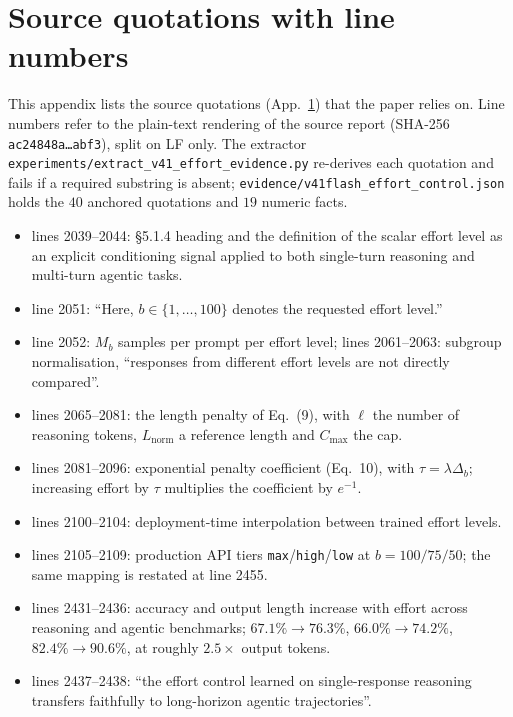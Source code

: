 \documentclass[10pt]{article} %
\newcommand{\eff}{b}
\begin{document}
\appendix

\section{Source quotations with line numbers}
\label{app:quotes}

This appendix lists the source quotations (App.~\ref{app:quotes}) that the paper relies on. Line numbers refer to the plain-text rendering of the source report
(SHA-256 \texttt{ac24848a\ldots abf3}), split on LF only. The extractor
\texttt{experiments/extract\_v41\_effort\_evidence.py} re-derives each quotation
and fails if a required substring is absent;
\texttt{evidence/v41flash\_effort\_control.json} holds the $40$ anchored
quotations and $19$ numeric facts.

\begin{itemize}
\item lines 2039--2044: \S5.1.4 heading and the definition of the scalar effort
  level as an explicit conditioning signal applied to both single-turn reasoning
  and multi-turn agentic tasks.
\item line 2051: ``Here, $\eff \in \{1, \ldots, 100\}$ denotes the requested
  effort level.''
\item line 2052: $M_b$ samples per prompt per effort level; lines 2061--2063:
  subgroup normalisation, ``responses from different effort levels are not
  directly compared''.
\item lines 2065--2081: the length penalty of Eq.~(9), with $\ell$ the number of
  reasoning tokens, $L_{\mathrm{norm}}$ a reference length and $C_{\max}$ the cap.
\item lines 2081--2096: exponential penalty coefficient (Eq.~10), with
  $\tau=\lambda\Delta_b$; increasing effort by $\tau$ multiplies the coefficient
  by $e^{-1}$.
\item lines 2100--2104: deployment-time interpolation between trained effort
  levels.
\item lines 2105--2109: production API tiers \texttt{max}/\texttt{high}/\texttt{low}
  at $\eff=100/75/50$; the same mapping is restated at line 2455.
\item lines 2431--2436: accuracy and output length increase with effort across
  reasoning and agentic benchmarks; $67.1\%\to76.3\%$, $66.0\%\to74.2\%$,
  $82.4\%\to90.6\%$, at roughly $2.5\times$ output tokens.
\item lines 2437--2438: ``the effort control learned on single-response reasoning
  transfers faithfully to long-horizon agentic trajectories''.

\end{itemize}
\end{document}
